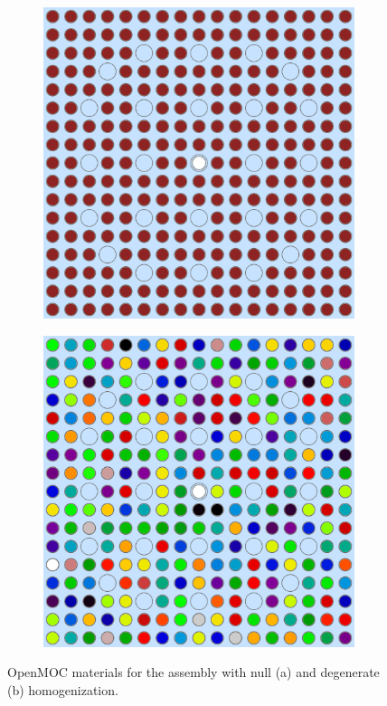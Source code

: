 \begin{figure}[h!]
\centering
\begin{subfigure}{0.42\textwidth}
  \centering
  \includegraphics[width=0.8\linewidth]{figures/assembly/geometry}
  \caption{}
  \label{fig:null-assm}
\end{subfigure}
\begin{subfigure}{0.42\textwidth}
  \centering
  \includegraphics[width=0.8\linewidth]{figures/assembly/degenerate-materials}
  \caption{}
  \label{fig:degenerate-assm}
\end{subfigure}
\caption{OpenMOC materials for the assembly with null (a) and degenerate (b) homogenization.}
\label{fig:benchmarks}
\end{figure}

